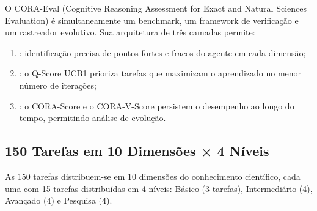 O CORA-Eval (Cognitive Reasoning Assessment for Exact and Natural
Sciences Evaluation) é simultaneamente um benchmark, um framework
de verificação e um rastreador evolutivo. Sua arquitetura de três
camadas permite:

\begin{enumerate}
\item {}: identificação precisa de
pontos fortes e fracos do agente em cada dimensão;
\item {}: o Q-Score UCB1 prioriza tarefas
que maximizam o aprendizado no menor número de iterações;
\item {}: o CORA-Score e o
CORA-V-Score persistem o desempenho ao longo do tempo, permitindo
análise de evolução.
\end{enumerate}

\subsection{150 Tarefas em 10 Dimensões × 4 Níveis}

As 150 tarefas distribuem-se em 10 dimensões do conhecimento
científico, cada uma com 15 tarefas distribuídas em 4 níveis:
Básico (3 tarefas), Intermediário (4), Avançado (4) e Pesquisa (4).

\begin{table}[htb]
\centering
    \small
\caption{Dimensões e Níveis do CORA-Eval}
\label{tab:cora-dimensoes}
\end{table}

